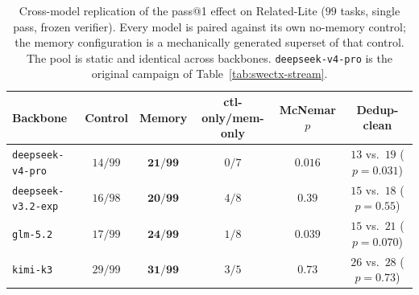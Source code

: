 \begin{table}[h]
\centering
\caption{Cross-model replication of the pass@1 effect on Related-Lite ($99$ tasks, single pass, frozen verifier). Every model is paired against its own no-memory control; the memory configuration is a mechanically generated superset of that control. The pool is static and identical across backbones. \texttt{deepseek-v4-pro} is the original campaign of Table~\ref{tab:swectx-stream}.}
\label{tab:swectx-xmodel}
\small
\begin{tabular}{lccccc}
\toprule
\textbf{Backbone} & \textbf{Control} & \textbf{Memory} & \textbf{ctl-only/mem-only} & \textbf{McNemar $p$} & \textbf{Dedup-clean} \\
\midrule
\texttt{deepseek-v4-pro} & $14/99$ & $\mathbf{21/99}$ & $0/7$ & $\mathbf{0.016}$ & $13$ vs.\ $19$ ($p{=}0.031$) \\
\texttt{deepseek-v3.2-exp} & $16/98$ & $\mathbf{20/99}$ & $4/8$ & $0.39$ & $15$ vs.\ $18$ ($p{=}0.55$) \\
\texttt{glm-5.2} & $17/99$ & $\mathbf{24/99}$ & $1/8$ & $\mathbf{0.039}$ & $15$ vs.\ $21$ ($p{=}0.070$) \\
\texttt{kimi-k3} & $29/99$ & $\mathbf{31/99}$ & $3/5$ & $0.73$ & $26$ vs.\ $28$ ($p{=}0.73$) \\
\bottomrule
\end{tabular}
\end{table}
